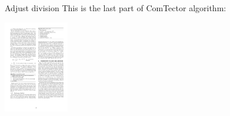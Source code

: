 







\begin{frame}{Adjust division}
\vskip 0.5cm
This is the last part of ComTector algorithm:
\begin{center}
	\includegraphics[height=4cm]{images/adjustDivision.pdf}
\end{center}
\end{frame}
